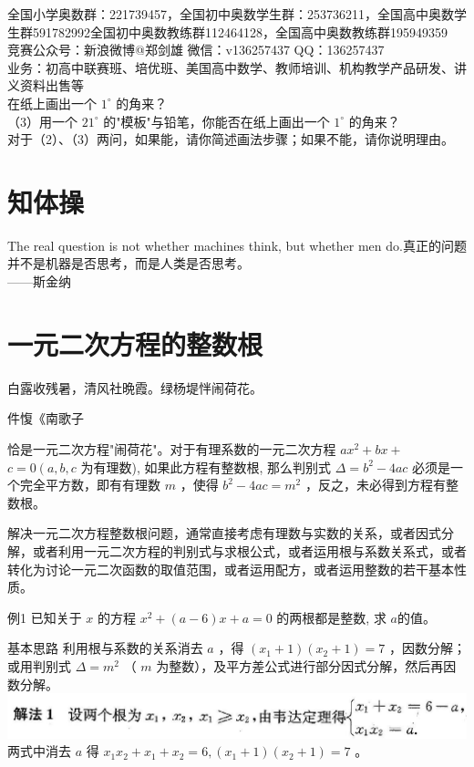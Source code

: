 \documentclass[10pt]{article}
\begin{document}
全国小学奥数群：221739457，全国初中奥数学生群：253736211，全国高中奥数学生群591782992全国初中奥数教练群112464128，全国高中奥数教练群195949359\\
竞赛公众号：新浪微博@郑剑雄 微信：v136257437 QQ：136257437\\
业务：初高中联赛班、培优班、美国高中数学、教师培训、机构教学产品研发、讲义资料出售等\\
在纸上画出一个 $1^{\circ}$ 的角来？\\
（3）用一个 $21^{\circ}$ 的"模板"与铅笔，你能否在纸上画出一个 $1^{\circ}$ 的角来？\\
对于（2）、（3）两问，如果能，请你简述画法步骤；如果不能，请你说明理由。

\section*{知体操}
The real question is not whether machines think, but whether men do.真正的问题并不是机器是否思考，而是人类是否思考。\\
——斯金纳

\section*{一元二次方程的整数根}
白露收残暑，清风社晩霞。绿杨堤怑闹荷花。

件愎《南歌子

恰是一元二次方程"闹荷花"。对于有理系数的一元二次方程 $a x^{2}+b x+$ $c=0\left(a, b, c\right.$ 为有理数), 如果此方程有整数根, 那么判别式 $\Delta=b^{2}-4 a c$ 必须是一个完全平方数，即有有理数 $m$ ，使得 $b^{2}-4 a c=m^{2}$ ，反之，未必得到方程有整数根。

解决一元二次方程整数根问题，通常直接考虑有理数与实数的关系，或者因式分解，或者利用一元二次方程的判别式与求根公式，或者运用根与系数关系式，或者转化为讨论一元二次函数的取值范围，或者运用配方，或者运用整数的若干基本性质。

例1 已知关于 $x$ 的方程 $x^{2}+(a-6) x+a=0$ 的两根都是整数, 求 $a$的值。

基本思路 利用根与系数的关系消去 $a$ ，得 $\left(x_{1}+1\right)\left(x_{2}+1\right)=7$ ，因数分解；或用判别式 $\Delta=m^{2}$ （ $m$ 为整数），及平方差公式进行部分因式分解，然后再因数分解。\\
\includegraphics[max width=\textwidth]{2024_10_30_26b590fd1106d28139f0g-101}两式中消去 $a$ 得 $x_{1} x_{2}+x_{1}+x_{2}=6,\left(x_{1}+1\right)\left(x_{2}+1\right)=7$ 。
\end{document}
